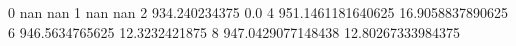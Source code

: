 0 nan nan
1 nan nan
2 934.240234375 0.0
4 951.1461181640625 16.9058837890625
6 946.5634765625 12.3232421875
8 947.0429077148438 12.80267333984375
